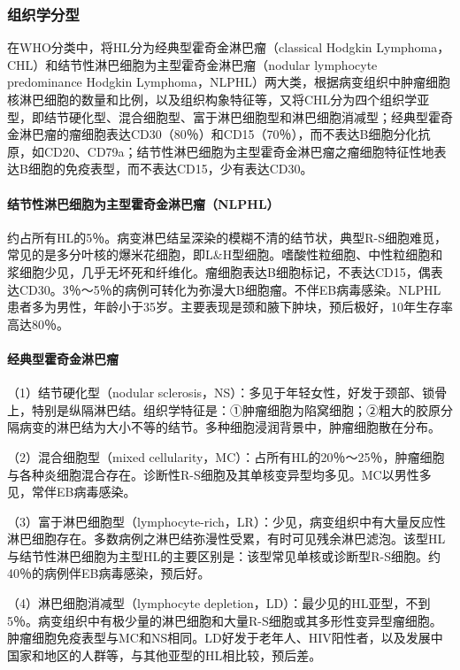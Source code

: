 \subsubsection{组织学分型}

在WHO分类中，将HL分为经典型霍奇金淋巴瘤（classical Hodgkin
Lymphoma，CHL）和结节性淋巴细胞为主型霍奇金淋巴瘤（nodular lymphocyte
predominance Hodgkin
Lymphoma，NLPHL）两大类，根据病变组织中肿瘤细胞核淋巴细胞的数量和比例，以及组织构象特征等，又将CHL分为四个组织学亚型，即结节硬化型、混合细胞型、富于淋巴细胞型和淋巴细胞消减型；经典型霍奇金淋巴瘤的瘤细胞表达CD30（80％）和CD15（70％），而不表达B细胞分化抗原，如CD20、CD79a；结节性淋巴细胞为主型霍奇金淋巴瘤之瘤细胞特征性地表达B细胞的免疫表型，而不表达CD15，少有表达CD30。

\paragraph{结节性淋巴细胞为主型霍奇金淋巴瘤（NLPHL）}
约占所有HL的5％。病变淋巴结呈深染的模糊不清的结节状，典型R-S细胞难觅，常见的是多分叶核的爆米花细胞，即L\&H型细胞。嗜酸性粒细胞、中性粒细胞和浆细胞少见，几乎无坏死和纤维化。瘤细胞表达B细胞标记，不表达CD15，偶表达CD30。3％～5％的病例可转化为弥漫大B细胞瘤。不伴EB病毒感染。NLPHL患者多为男性，年龄小于35岁。主要表现是颈和腋下肿块，预后极好，10年生存率高达80％。

\paragraph{经典型霍奇金淋巴瘤}
（1）结节硬化型（nodular
sclerosis，NS）：多见于年轻女性，好发于颈部、锁骨上，特别是纵隔淋巴结。组织学特征是：①肿瘤细胞为陷窝细胞；②粗大的胶原分隔病变的淋巴结为大小不等的结节。多种细胞浸润背景中，肿瘤细胞散在分布。

（2）混合细胞型（mixed
cellularity，MC）：占所有HL的20％～25％，肿瘤细胞与各种炎细胞混合存在。诊断性R-S细胞及其单核变异型均多见。MC以男性多见，常伴EB病毒感染。

（3）富于淋巴细胞型（lymphocyte-rich，LR）：少见，病变组织中有大量反应性淋巴细胞存在。多数病例之淋巴结弥漫性受累，有时可见残余淋巴滤泡。该型HL与结节性淋巴细胞为主型HL的主要区别是：该型常见单核或诊断型R-S细胞。约40％的病例伴EB病毒感染，预后好。

（4）淋巴细胞消减型（lymphocyte
depletion，LD）：最少见的HL亚型，不到5％。病变组织中有极少量的淋巴细胞和大量R-S细胞或其多形性变异型瘤细胞。肿瘤细胞免疫表型与MC和NS相同。LD好发于老年人、HIV阳性者，以及发展中国家和地区的人群等，与其他亚型的HL相比较，预后差。


